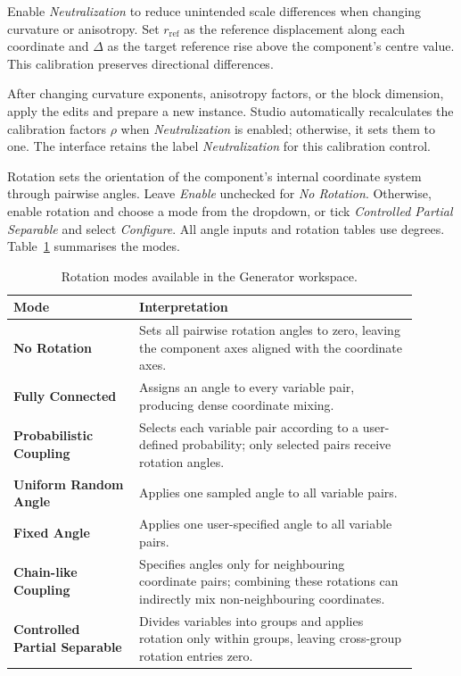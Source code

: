 \documentclass[journal,onecolumn]{IEEEtran}
\begin{document}
Enable \emph{Neutralization} to reduce unintended scale differences when changing curvature or anisotropy. Set $r_{\mathrm{ref}}$ as the reference displacement along each coordinate and $\Delta$ as the target reference rise above the component's centre value. This calibration preserves directional differences.

After changing curvature exponents, anisotropy factors, or the block dimension, apply the edits and prepare a new instance. Studio automatically recalculates the calibration factors $\rho$ when \emph{Neutralization} is enabled; otherwise, it sets them to one. The interface retains the label \emph{Neutralization} for this calibration control.

Rotation sets the orientation of the component's internal coordinate system through pairwise angles. Leave \emph{Enable} unchecked for \emph{No Rotation}. Otherwise, enable rotation and choose a mode from the dropdown, or tick \emph{Controlled Partial Separable} and select \emph{Configure}. All angle inputs and rotation tables use degrees. Table~\ref{tab:manual:rotation-modes} summarises the modes.

\begin{table}[H]
\centering
\small
\caption{Rotation modes available in the Generator workspace.}
\label{tab:manual:rotation-modes}
\begin{tabular}{@{}p{0.28\linewidth}p{0.62\linewidth}@{}}
\toprule
\textbf{Mode} & \textbf{Interpretation} \\
\midrule
\textbf{No Rotation} & Sets all pairwise rotation angles to zero, leaving the component axes aligned with the coordinate axes. \\
\textbf{Fully Connected} & Assigns an angle to every variable pair, producing dense coordinate mixing. \\
\textbf{Probabilistic Coupling} & Selects each variable pair according to a user-defined probability; only selected pairs receive rotation angles. \\
\textbf{Uniform Random Angle} & Applies one sampled angle to all variable pairs. \\
\textbf{Fixed Angle} & Applies one user-specified angle to all variable pairs. \\
\textbf{Chain-like Coupling} & Specifies angles only for neighbouring coordinate pairs; combining these rotations can indirectly mix non-neighbouring coordinates. \\
\textbf{Controlled Partial Separable} & Divides variables into groups and applies rotation only within groups, leaving cross-group rotation entries zero. \\
\bottomrule
\end{tabular}
\end{table}
\end{document}
